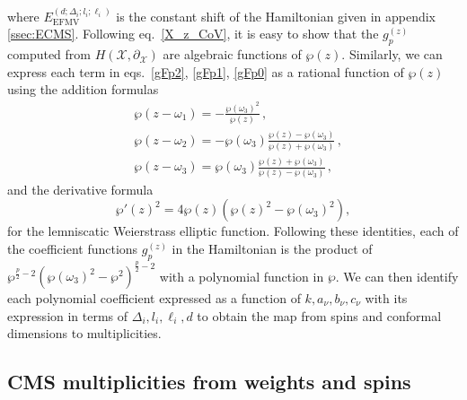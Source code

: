 \documentclass{article}
\def \om {\omega}
\def \Dg {\Delta}
\begin{document}
where $E_{\mathrm{EFMV}}^{(d;\Dg_i;l_i;\ell_i)}$ is the constant shift of the Hamiltonian given in appendix \ref{ssec:ECMS}. Following eq.\ \eqref{X_z_CoV}, it is easy to show that the $g_p^{(z)}$ computed from $H(\mathcal{X},\partial_{\mathcal{X}})$ are algebraic functions of $\wp (z)$. Similarly, we can express each term in eqs.\ \eqref{gFp2}, \eqref{gFp1}, \eqref{gFp0} as a rational function of $\wp (z)$ using the addition formulas 
\begin{align}
 &\wp\left( z -\om_1  \right) =- \frac{\wp(\om_3)^2}{\wp(z)}\,,\label{p1+i} \\
 &\wp(z-\om_2) = - \wp(\om_3) \frac{\wp(z)-\wp(\om_3)}{\wp(z)+\wp(\om_3)}\,,  \label{pi}\\
&\wp(z-\om_3) = \wp(\om_3) \frac{\wp(z)+\wp(\om_3)}{\wp(z)-\wp(\om_3)}\,, \label{p1} 
\end{align}
and the derivative formula
\begin{equation}
\wp'(z)^2 = 4 \wp(z) \left( \wp(z)^2-\wp(\om_3)^2 \right),
\label{dp}
\end{equation}
for the lemniscatic Weierstrass elliptic function. Following these identities, each of the
coefficient functions $g_p^{(z)}$ in the Hamiltonian is the product of $\wp^{\frac{p}{2}-2}\left(\wp(\om_3)^2-\wp^2\right)^{\frac{p}{2}-2}$ with a polynomial function in $\wp$. We can then identify each polynomial coefficient expressed as a function of $k,a_{\nu},b_{\nu},c_{\nu}$ with its expression in terms of $\Delta_i,l_i,\ell_i,d$ to obtain the map from spins and conformal dimensions to multiplicities.

\subsection{CMS multiplicities from weights and spins} 
\label{ssec:CMS_multiplicities}
\end{document}
